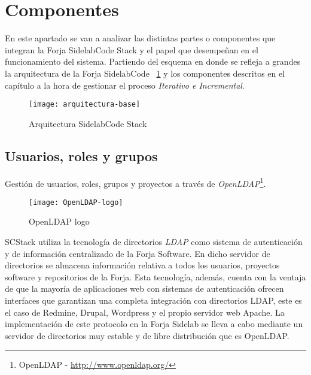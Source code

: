 \section{Componentes}
\label{sec:componentes}

\par En este apartado se van a analizar las distintas partes o componentes que integran la Forja SidelabCode Stack y el papel que desempeñan en el funcionamiento del sistema. Partiendo del esquema en donde se refleja a grandes la arquitectura de la Forja SidelabCode ~\ref{fig:arquitectura-scstack} y los componentes descritos en el capítulo  a la hora de gestionar el proceso \emph{Iterativo e Incremental}.

\begin{figure}[H]
    \centering
    \texttt{[image: arquitectura-base]}
    \caption{Arquitectura SidelabCode Stack}
    \label{fig:arquitectura-scstack}
\end{figure}


\subsection{Usuarios, roles y grupos}
\label{sub:usuarios-roles-grupos}

\par Gestión de usuarios, roles, grupos y proyectos a través de \emph{OpenLDAP}\footnote{OpenLDAP - \url{http://www.openldap.org/}}.

\begin{figure}[H]
    \centering
    \texttt{[image: OpenLDAP-logo]}
    \caption{OpenLDAP logo}
    \label{fig:openldap-logo}
\end{figure}

\par SCStack utiliza la tecnología de directorios \emph{LDAP} como sistema de autenticación y de información centralizado de la Forja Software. En dicho servidor de directorios se almacena información relativa a todos los usuarios, proyectos software y repositorios de la Forja. Esta tecnología, además, cuenta con la ventaja de que la mayoría de aplicaciones web con sistemas de autenticación ofrecen interfaces que garantizan una completa integración con directorios LDAP, este es el caso de Redmine, Drupal, Wordpress y el propio servidor web Apache. La implementación de este protocolo en la Forja Sidelab se lleva a cabo mediante un servidor de directorios muy estable y de libre distribución que es OpenLDAP.

